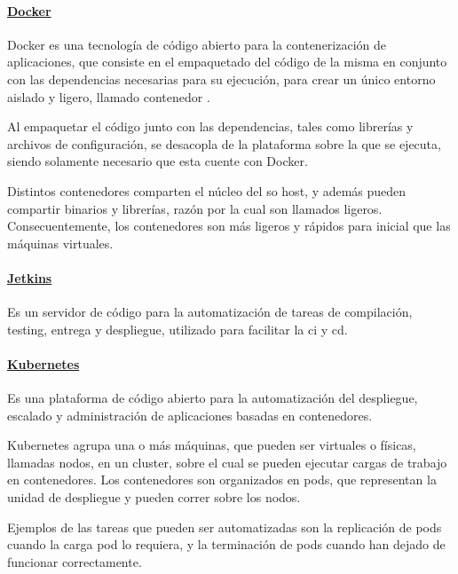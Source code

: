 \paragraph{\href{https://www.docker.com/}{Docker}}
Docker es una tecnología de código abierto para la contenerización de aplicaciones, que consiste en el empaquetado del código de la misma en conjunto con las dependencias necesarias para su ejecución, para crear un único entorno aislado y ligero, llamado contenedor \cite{ibmContainerization}.

Al empaquetar el código junto con las dependencias, tales como librerías y archivos de configuración, se desacopla de la plataforma sobre la que se ejecuta, siendo solamente necesario que esta cuente con Docker.

Distintos contenedores comparten el núcleo del \acrfull{so} host, y además pueden compartir binarios y librerías, razón por la cual son llamados ligeros. Consecuentemente, los contenedores son más ligeros y rápidos para inicial que las máquinas virtuales.

\paragraph{\href{https://www.jenkins.io/}{Jetkins}}
Es un servidor de código para la automatización de tareas de compilación, testing, entrega y despliegue, utilizado para facilitar la \acrfull{ci} y \acrfull{cd}.

\paragraph{\href{https://kubernetes.io/es/}{Kubernetes}}
Es una plataforma de código abierto para la automatización del despliegue, escalado y administración de aplicaciones basadas en contenedores.

Kubernetes agrupa una o más máquinas, que pueden ser virtuales o físicas, llamadas nodos, en un cluster, sobre el cual se pueden ejecutar cargas de trabajo en contenedores. Los contenedores son organizados en pods, que representan la unidad de despliegue y pueden correr sobre los nodos.

Ejemplos de las tareas que pueden ser automatizadas son la replicación de pods cuando la carga pod lo requiera, y la terminación de pods cuando han dejado de funcionar correctamente.
